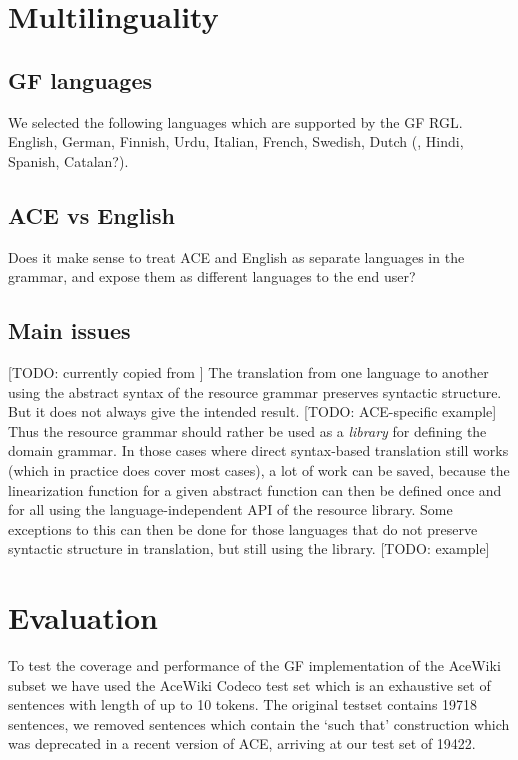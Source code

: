 \documentclass[a4paper]{article}
\begin{document}
\section{Multilinguality}

\subsection{GF languages}

We selected the following languages which are supported by the GF RGL.
English, German, Finnish, Urdu, Italian, French, Swedish, Dutch
(, Hindi, Spanish, Catalan?).

\subsection{ACE vs English}

Does it make sense to treat ACE and English as separate languages in the
grammar, and expose them as different languages to the end user?

\subsection{Main issues}

[TODO: currently copied from \cite{ranta:cnl2009_revised}]
The translation from one language to another using the abstract syntax of the
resource grammar preserves syntactic structure. But it does not always give
the intended result. [TODO: ACE-specific example]
Thus the resource grammar should rather be used as a \emph{library} for
defining the domain grammar. In those cases where direct syntax-based
translation still works (which in practice does cover most cases), a lot of
work can be saved, because the linearization function for a given abstract
function can then be defined once and for all using the language-independent
API of the resource library. Some exceptions to this can then be done for
those languages that do not preserve syntactic structure in translation,
but still using the library. [TODO: example]

\section{Evaluation}

To test the coverage and performance of the GF implementation of the
AceWiki subset we have used
the AceWiki Codeco test set which
is an exhaustive set of sentences with length of up to 10 tokens.
The original testset contains 19718 sentences, we removed sentences which
contain the `such that' construction which was deprecated in a recent
version of ACE, arriving at our test set of 19422.
\end{document}
